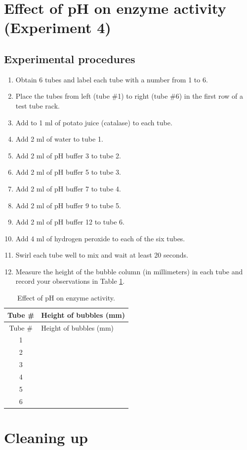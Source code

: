 \documentclass[]{book}
\providecommand{\tightlist}{%
  \setlength{\itemsep}{0pt}\setlength{\parskip}{0pt}}
\theoremstyle{definition}
\theoremstyle{definition}
\theoremstyle{definition}
\theoremstyle{remark}
\begin{document}
\section{Effect of pH on enzyme activity (Experiment
4)}\label{effect-of-ph-on-enzyme-activity-experiment-4}

\subsection{Experimental procedures}\label{experimental-procedures-23}

\begin{enumerate}
\def\labelenumi{\arabic{enumi}.}
\tightlist
\item
  Obtain 6 tubes and label each tube with a number from 1 to 6.
\item
  Place the tubes from left (tube \#1) to right (tube \#6) in the first
  row of a test tube rack.
\item
  Add to 1 ml of potato juice (catalase) to each tube.
\item
  Add 2 ml of water to tube 1.
\item
  Add 2 ml of pH buffer 3 to tube 2.
\item
  Add 2 ml of pH buffer 5 to tube 3.
\item
  Add 2 ml of pH buffer 7 to tube 4.
\item
  Add 2 ml of pH buffer 9 to tube 5.
\item
  Add 2 ml of pH buffer 12 to tube 6.
\item
  Add 4 ml of hydrogen peroxide to each of the six tubes.
\item
  Swirl each tube well to mix and wait at least 20 seconds.
\item
  Measure the height of the bubble column (in millimeters) in each tube
  and record your observations in Table \ref{tab:pH}.
\end{enumerate}

\begin{longtable}[]{@{}cl@{}}
\caption{\label{tab:pH} Effect of pH on enzyme activity.}\tabularnewline
\toprule
Tube \# & Height of bubbles (mm)\tabularnewline
\midrule
\endfirsthead
\toprule
Tube \# & Height of bubbles (mm)\tabularnewline
\midrule
\endhead
1 &\tabularnewline
2 &\tabularnewline
3 &\tabularnewline
4 &\tabularnewline
5 &\tabularnewline
6 &\tabularnewline
\bottomrule
\end{longtable}

\section{Cleaning up}\label{cleaning-up-5}
\end{document}
